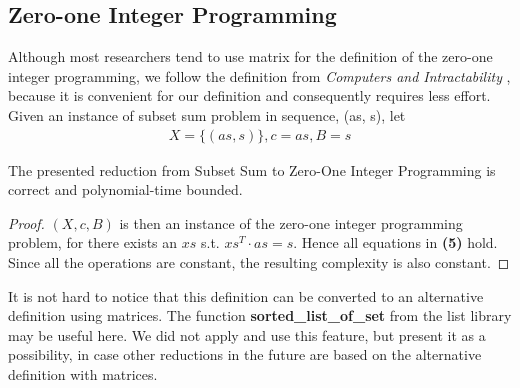 \subsection{Zero-one Integer Programming}
Although most researchers tend to use matrix for the 
definition of the zero-one integer programming, we follow the definition from \textit{Computers and Intractability} \cite{garey1979computers}, because 
it is convenient for our definition and consequently requires less effort. Given an instance of subset sum problem in sequence,
(as, s), let 
\begin{align*}
    X = \{(as, s)\}, c = as, B = s
\end{align*} 
\begin{theorem}
    The presented reduction from Subset Sum to Zero-One Integer Programming is correct and polynomial-time bounded.
\end{theorem}
\begin{proof}
    $(X, c, B)$ is then an instance of the zero-one integer programming problem,
    for there exists an $xs$ s.t. $xs^T \cdot as = s$. Hence all equations in \textbf{(5)} hold.
    Since all the operations are constant, the resulting complexity is also constant.
\end{proof}
It is not hard to notice that this definition can be converted to an alternative definition using matrices. 
The function \textbf{sorted\_list\_of\_set} from the list library may be useful here. 
We did not apply and use this feature, but present it as a possibility, 
in case other reductions in the future are based on the alternative definition with matrices.
